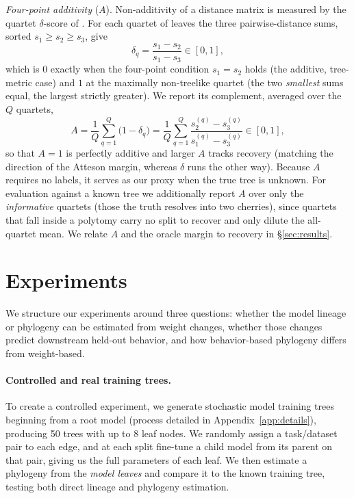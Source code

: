 \documentclass{article}
\theoremstyle{definition}
\theoremstyle{plain}
\begin{document}
\textit{Four-point additivity} ($A$). Non-additivity of a distance matrix is measured by the quartet
$\delta$-score of \citet{holland2002delta}. For each quartet of leaves the three pairwise-distance sums,
sorted $s_1\ge s_2\ge s_3$, give
\[
  \delta_q=\frac{s_1-s_2}{s_1-s_3}\in[0,1] ,
\]
which is $0$ exactly when the four-point condition $s_1=s_2$ holds \citep{sempleSteel2003phylogenetics}
(the additive, tree-metric case) and $1$ at the maximally non-treelike quartet (the two \emph{smallest}
sums equal, the largest strictly greater). We report its complement, averaged over the $Q$ quartets,
\[
  A=\frac{1}{Q}\sum_{q=1}^{Q}\bigl(1-\delta_q\bigr)
   =\frac{1}{Q}\sum_{q=1}^{Q}\frac{s_2^{(q)}-s_3^{(q)}}{s_1^{(q)}-s_3^{(q)}}\in[0,1] ,
\]
so that $A=1$ is perfectly additive and larger $A$ tracks recovery (matching the direction of the
Atteson margin, whereas $\delta$ runs the other way). Because $A$ requires no labels,
it serves as our proxy when the true tree is unknown. For evaluation against a known tree we
additionally report $A$ over only the \emph{informative} quartets (those the truth resolves into two
cherries), since quartets that fall inside a polytomy carry no split to recover and only dilute the
all-quartet mean. We relate $A$ and the oracle margin to recovery in \S\ref{sec:results}.


\section{Experiments}
\label{sec:experiments}
We structure our experiments around three questions: whether the model lineage or phylogeny can be
estimated from weight changes, whether those changes predict downstream held-out behavior, and
how behavior-based phylogeny differs from weight-based.

\paragraph{Controlled and real training trees.}
\label{sec:exp:trees}

To create a controlled experiment, we generate stochastic model training trees beginning from a root model (process detailed in Appendix~\ref{app:details}), producing 50 trees with up to 8 leaf nodes. We randomly assign a task/dataset pair to each edge, and at each split fine-tune a child model from its parent on that pair, giving us the full parameters of each leaf. We then estimate a phylogeny from the \textit{model leaves} and compare it to the known training tree, testing both direct lineage and phylogeny estimation.
\end{document}
